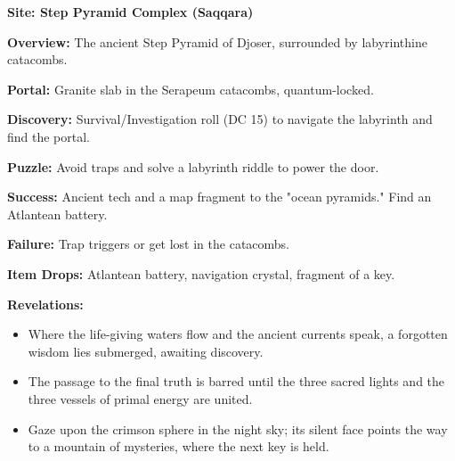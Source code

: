 \documentclass[12pt]{article}
\begin{document}
\textbf{Site: Step Pyramid Complex (Saqqara)}

\textbf{Overview:}  
The ancient Step Pyramid of Djoser, surrounded by labyrinthine catacombs.

\textbf{Portal:}  
Granite slab in the Serapeum catacombs, quantum-locked.

\textbf{Discovery:}  
Survival/Investigation roll (DC 15) to navigate the labyrinth and find the portal.

\textbf{Puzzle:}  
Avoid traps and solve a labyrinth riddle to power the door.

\textbf{Success:}  
Ancient tech and a map fragment to the "ocean pyramids." Find an Atlantean battery.

\textbf{Failure:}  
Trap triggers or get lost in the catacombs.

\textbf{Item Drops:}  
Atlantean battery, navigation crystal, fragment of a key.

\textbf{Revelations:}
\begin{itemize}
  \item Where the life-giving waters flow and the ancient currents speak, a forgotten wisdom lies submerged, awaiting discovery.
  \item The passage to the final truth is barred until the three sacred lights and the three vessels of primal energy are united.
  \item Gaze upon the crimson sphere in the night sky; its silent face points the way to a mountain of mysteries, where the next key is held.
\end{itemize}
\end{document}
